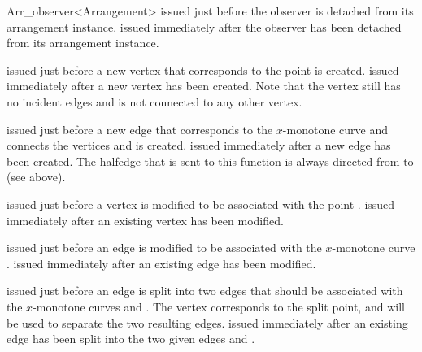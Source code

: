 \begin{ccRefClass}{Arr_observer<Arrangement>}
    {issued just before the observer is detached from its arrangement instance.}
\ccGlue
{}
    {issued immediately after the observer has been detached from its
     arrangement instance.}



    {issued just before a new vertex that corresponds to the point 
     is created.}
\ccGlue
{}
    {issued immediately after a new vertex  has been created.
     Note that the vertex still has no incident edges and is not connected
     to any other vertex.}

    {issued just before a new edge that corresponds to the $x$-monotone curve 
      and connects the vertices  and  is created.}
\ccGlue
{}
    {issued immediately after a new edge  has been created.
     The halfedge that is sent to this function is always directed from 
      to  (see above).}

    {issued just before a vertex  is modified to be associated with
     the point .}
\ccGlue
{}
    {issued immediately after an existing vertex  has been modified.}

    {issued just before an edge  is modified to be associated with
     the $x$-monotone curve .}
\ccGlue
{}
    {issued immediately after an existing edge  has been modified.}

    {issued just before an edge  is split into two edges that should
     be associated with the $x$-monotone curves  and . The
     vertex  corresponds to the split point, and will be used to
     separate the two resulting edges.}
\ccGlue
{}
    {issued immediately after an existing edge has been split into the two
     given edges  and .}


\end{ccRefClass}
